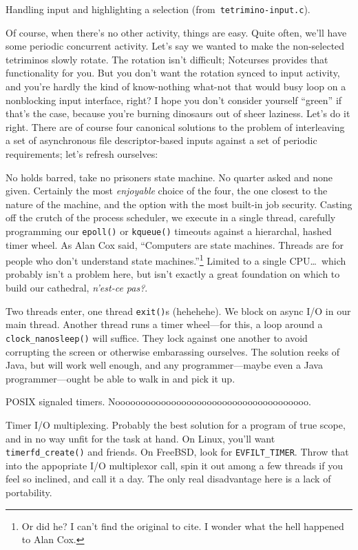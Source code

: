 \begin{listing}[!htbp]
\inputminted[]{C}{code/tetrimino-inputmain.h}
\caption{Handling input and highlighting a selection (from~\texttt{tetrimino-input.c}).}
\label{list:tetrimino-input}
\end{listing}

Of course, when there's no other activity, things are easy. Quite often, we'll
have some periodic concurrent activity. Let's say we wanted to make the non-selected
tetriminos slowly rotate. The rotation isn't difficult; Notcurses provides
that functionality for you. But you don't want the rotation synced to input
activity, and you're hardly the kind of know-nothing what-not that would
busy loop on a nonblocking input interface, right? I hope you don't consider
yourself ``green'' if that's the case, because you're burning dinosaurs out
of sheer laziness. Let's do it right. There are of course four canonical
solutions to the problem of interleaving a set of asynchronous file descriptor-based
inputs against a set of periodic requirements; let's refresh ourselves:

\begin{denseitemize}
\item{No holds barred, take no prisoners state machine. No quarter asked and
    none given. Certainly the most \textit{enjoyable} choice of the four, the
    one closest to the nature of the machine, and the option with the most
    built-in job security. Casting off the crutch of the process scheduler, we
    execute in a single thread, carefully programming our
    \texttt{epoll()}\cite{epoll7} or \texttt{kqueue()}\cite{kqueue2} timeouts
    against a hierarchal, hashed timer wheel\cite{timerwheels}. As Alan Cox
    said, ``Computers are state machines. Threads are for people who don't
    understand state machines.''\footnote{Or did he? I can't find the original
    to cite. I wonder what the hell happened to Alan Cox.} Limited to a single
  CPU\ldots\ which probably isn't a problem here, but isn't exactly a great foundation
  on which to build our cathedral, \textfrench{\textit{n'est-ce pas?}}.}
\item{Two threads enter, one thread \texttt{exit()}s (hehehehe). We block on
    async I/O in our main thread. Another thread runs a timer wheel---for this,
    a loop around a \texttt{clock\_nanosleep()} will suffice. They
    lock against one another to avoid corrupting the screen or otherwise
    embarassing ourselves. The solution reeks of Java, but will work well
    enough, and any programmer---maybe even a Java programmer---ought be able
    to walk in and pick it up.}
\item{POSIX signaled timers. Noooooooooooooooooooooooooooooooooooooo.}
\item{Timer I/O multiplexing. Probably the best solution for a program of true
    scope, and in no way unfit for the task at hand. On Linux, you'll want
    \texttt{timerfd\_create()} and friends. On FreeBSD, look for \texttt{EVFILT\_TIMER}.
    Throw that into the appopriate I/O multiplexor call, spin it out among a
    few threads if you feel so inclined\cite{libtorque}, and call it a day.
  The only real disadvantage here is a lack of portability.}
\end{denseitemize}

